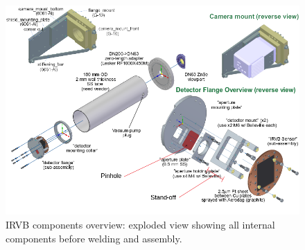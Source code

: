 \begin{figure}
	\centering
	\includegraphics[trim={0 0 0 0},clip,width=\linewidth]{Chapters/chapter2/figs/IRVB3.png}
     \caption{IRVB components overview: exploded view showing all internal components before welding and assembly.}
     \label{fig:IRVB3}
\end{figure}

